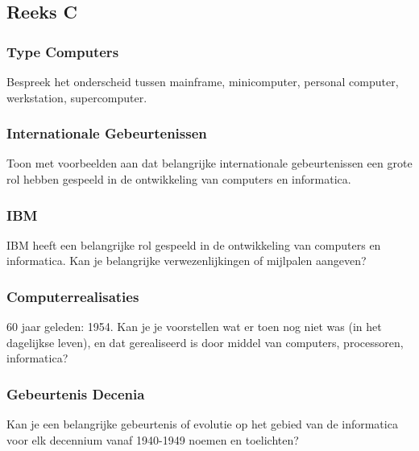 \documentclass[../main.tex]{subfiles}
\begin{document}
\subsection{Reeks C}
\subsubsection{Type Computers}
\begin{question}
Bespreek het onderscheid tussen mainframe, minicomputer, personal computer, werkstation, supercomputer.
\end{question}
\begin{solution}
\end{solution}

\subsubsection{Internationale Gebeurtenissen}
\begin{question}
Toon met voorbeelden aan dat belangrijke internationale gebeurtenissen een grote rol hebben gespeeld in de ontwikkeling van computers en informatica.
\end{question}

\subsubsection{IBM}
\begin{question}
IBM heeft een belangrijke rol gespeeld in de ontwikkeling van computers en informatica. Kan je belangrijke verwezenlijkingen of mijlpalen aangeven?
\end{question}

\subsubsection{Computerrealisaties}
\begin{question}
60 jaar geleden: 1954. Kan je je voorstellen wat er toen nog niet was (in het dagelijkse leven), en dat gerealiseerd is door middel van computers, processoren, informatica?
\end{question}

\subsubsection{Gebeurtenis Decenia}
\begin{question}
Kan je een belangrijke gebeurtenis of evolutie op het gebied van de informatica voor elk decennium vanaf 1940-1949 noemen en toelichten?
\end{question}
\end{document}
